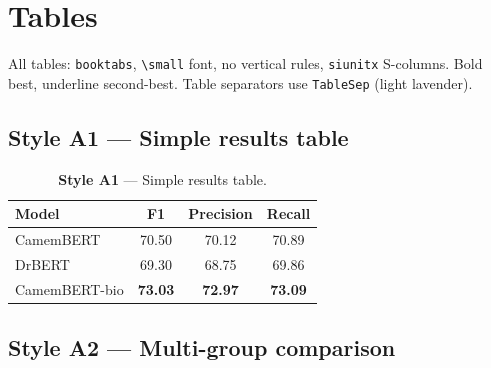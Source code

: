 \documentclass[11pt, a4paper]{article}
\begin{document}
\newpage

\section{Tables}
\label{sec:tables}

All tables: \texttt{booktabs}, \verb|\small| font, no vertical rules, \texttt{siunitx} S-columns. Bold best, underline second-best. Table separators use \texttt{TableSep} (light lavender).

\bigskip

\subsection{Style A1 — Simple results table}

\begin{table}[h]
\centering
\small
\setlength{\tabcolsep}{12pt}
\begin{tabular}{l S[table-format=2.2] S[table-format=2.2] S[table-format=2.2]}
\toprule
\textbf{Model} & {\textbf{F1}} & {\textbf{Precision}} & {\textbf{Recall}} \\
\midrule
CamemBERT       & 70.50 & 70.12 & 70.89 \\
DrBERT          & 69.30 & 68.75 & 69.86 \\
CamemBERT-bio   & \bfseries 73.03 & \bfseries 72.97 & \bfseries 73.09 \\
\bottomrule
\end{tabular}
\caption{\textbf{Style A1} --- Simple results table.}
\label{tab:a1}
\end{table}

\subsection{Style A2 — Multi-group comparison}
\end{document}
